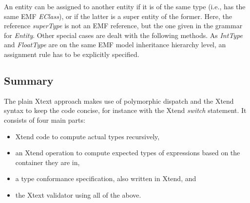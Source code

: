 An entity can be assigned to another entity if it is of the same type (i.e., has
the same EMF \emph{EClass}), or if the latter is a super entity of the
former.
Here, the reference \emph{superType} is not an EMF reference, but the one given in the grammar for
\emph{Entity}. Other special cases are dealt with the following methods. As
\emph{IntType} and \emph{FloatType} are on the same EMF model inheritance
hierarchy level, an assignment rule has to be explicitly specified.



\subsection{Summary}
The plain Xtext approach makes use of polymorphic dispatch and the Xtend syntax
to keep the code concise, for instance with the Xtend \emph{switch} statement.
It consists of four main parts:
\begin{itemize}
\item Xtend code to compute actual types recursively,
\item an Xtend operation to compute expected types of expressions based on the container they are in,
\item a type conformance specification, also written in Xtend, and
\item the Xtext validator using all of the above.
\end{itemize}

